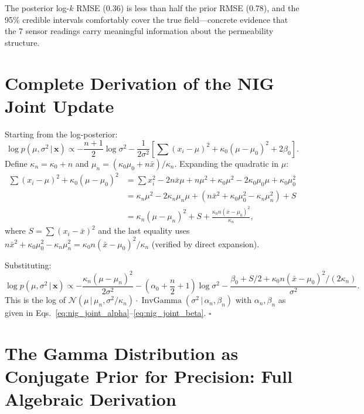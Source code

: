 \documentclass[11pt, a4paper]{article}
\newcommand{\N}{\mathcal{N}}
\newcommand{\IG}{\operatorname{InvGamma}}
\theoremstyle{definition}
\begin{document}
The posterior log-$k$ RMSE (0.36) is less than half the prior RMSE (0.78),
and the 95\% credible intervals comfortably cover the true field---concrete
evidence that the 7 sensor readings carry meaningful information about the
permeability structure.

\appendix
\section{Complete Derivation of the NIG Joint Update}

Starting from the log-posterior:
\[
  \log p(\mu,\sigma^2\,|\,\mathbf{x})
  \propto
  -\frac{n+1}{2}\log\sigma^2
  -\frac{1}{2\sigma^2}\!\left[
    \sum(x_i-\mu)^2 + \kappa_0(\mu-\mu_0)^2 + 2\beta_0
  \right].
\]
Define $\kappa_n=\kappa_0+n$ and $\mu_n=(\kappa_0\mu_0+n\bar{x})/\kappa_n$.
Expanding the quadratic in $\mu$:
\begin{align*}
  \sum(x_i-\mu)^2 + \kappa_0(\mu-\mu_0)^2
  &= \sum x_i^2 - 2n\bar{x}\mu + n\mu^2
     + \kappa_0\mu^2 - 2\kappa_0\mu_0\mu + \kappa_0\mu_0^2 \\
  &= \kappa_n\mu^2 - 2\kappa_n\mu_n\mu + (n\bar{x}^2+\kappa_0\mu_0^2-\kappa_n\mu_n^2) + S \\
  &= \kappa_n(\mu-\mu_n)^2 + S + \frac{\kappa_0 n(\bar{x}-\mu_0)^2}{\kappa_n},
\end{align*}
where $S=\sum(x_i-\bar{x})^2$ and the last equality uses
$n\bar{x}^2+\kappa_0\mu_0^2-\kappa_n\mu_n^2=\kappa_0 n(\bar{x}-\mu_0)^2/\kappa_n$
(verified by direct expansion).

Substituting:
\[
  \log p(\mu,\sigma^2\,|\,\mathbf{x})
  \propto
  -\frac{\kappa_n(\mu-\mu_n)^2}{2\sigma^2}
  -\left(\alpha_0+\frac{n}{2}+1\right)\!\log\sigma^2
  -\frac{\beta_0+S/2+\kappa_0 n(\bar{x}-\mu_0)^2/(2\kappa_n)}{\sigma^2}.
\]
This is the log of $\N(\mu\,|\,\mu_n,\sigma^2/\kappa_n)\cdot\IG(\sigma^2\,|\,\alpha_n,\beta_n)$
with $\alpha_n,\beta_n$ as given in
Eqs.~\eqref{eq:nig_joint_alpha}--\eqref{eq:nig_joint_beta}. \hfill$\square$

\section{The Gamma Distribution as Conjugate Prior for Precision:
         Full Algebraic Derivation}
\label{app:gamma_precision}
\end{document}
